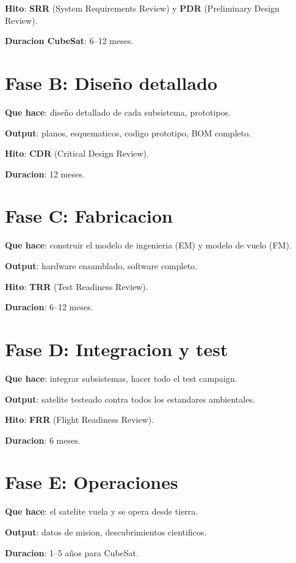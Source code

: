 \documentclass[11pt,a4paper,oneside,openright]{book}
\begin{document}
\textbf{Hito}: \textbf{SRR} (System Requirements Review) y \textbf{PDR}
(Preliminary Design Review).

\textbf{Duracion CubeSat}: 6--12 meses.

\section{Fase B: Diseño detallado}

\textbf{Que hace}: diseño detallado de cada subsistema, prototipos.

\textbf{Output}: planos, esquematicos, codigo prototipo, BOM completo.

\textbf{Hito}: \textbf{CDR} (Critical Design Review).

\textbf{Duracion}: 12 meses.

\section{Fase C: Fabricacion}

\textbf{Que hace}: construir el modelo de ingenieria (EM) y modelo de
vuelo (FM).

\textbf{Output}: hardware ensamblado, software completo.

\textbf{Hito}: \textbf{TRR} (Test Readiness Review).

\textbf{Duracion}: 6--12 meses.

\section{Fase D: Integracion y test}

\textbf{Que hace}: integrar subsistemas, hacer todo el test campaign.

\textbf{Output}: satelite testeado contra todos los estandares
ambientales.

\textbf{Hito}: \textbf{FRR} (Flight Readiness Review).

\textbf{Duracion}: 6 meses.

\section{Fase E: Operaciones}

\textbf{Que hace}: el satelite vuela y se opera desde tierra.

\textbf{Output}: datos de mision, descubrimientos cientificos.

\textbf{Duracion}: 1--5 años para CubeSat.
\end{document}
